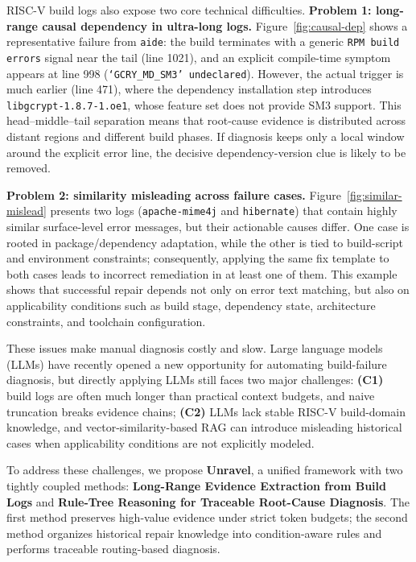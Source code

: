 \documentclass[sigconf]{acmart}
\begin{document}
RISC-V build logs also expose two core technical difficulties. \textbf{Problem 1: long-range causal dependency in ultra-long logs.} Figure~\ref{fig:causal-dep} shows a representative failure from \texttt{aide}: the build terminates with a generic \texttt{RPM build errors} signal near the tail (line 1021), and an explicit compile-time symptom appears at line 998 (\texttt{`GCRY\_MD\_SM3' undeclared}). However, the actual trigger is much earlier (line 471), where the dependency installation step introduces \texttt{libgcrypt-1.8.7-1.oe1}, whose feature set does not provide SM3 support. This head--middle--tail separation means that root-cause evidence is distributed across distant regions and different build phases. If diagnosis keeps only a local window around the explicit error line, the decisive dependency-version clue is likely to be removed.

\textbf{Problem 2: similarity misleading across failure cases.} Figure~\ref{fig:similar-mislead} presents two logs (\texttt{apache-mime4j} and \texttt{hibernate}) that contain highly similar surface-level error messages, but their actionable causes differ. One case is rooted in package/dependency adaptation, while the other is tied to build-script and environment constraints; consequently, applying the same fix template to both cases leads to incorrect remediation in at least one of them. This example shows that successful repair depends not only on error text matching, but also on applicability conditions such as build stage, dependency state, architecture constraints, and toolchain configuration.

These issues make manual diagnosis costly and slow. Large language models (LLMs) have recently opened a new opportunity for automating build-failure diagnosis, but directly applying LLMs still faces two major challenges: \textbf{(C1)} build logs are often much longer than practical context budgets, and naive truncation breaks evidence chains; \textbf{(C2)} LLMs lack stable RISC-V build-domain knowledge, and vector-similarity-based RAG can introduce misleading historical cases when applicability conditions are not explicitly modeled.

To address these challenges, we propose \textbf{Unravel}, a unified framework with two tightly coupled methods: \textbf{Long-Range Evidence Extraction from Build Logs} and \textbf{Rule-Tree Reasoning for Traceable Root-Cause Diagnosis}. The first method preserves high-value evidence under strict token budgets; the second method organizes historical repair knowledge into condition-aware rules and performs traceable routing-based diagnosis.
\end{document}
